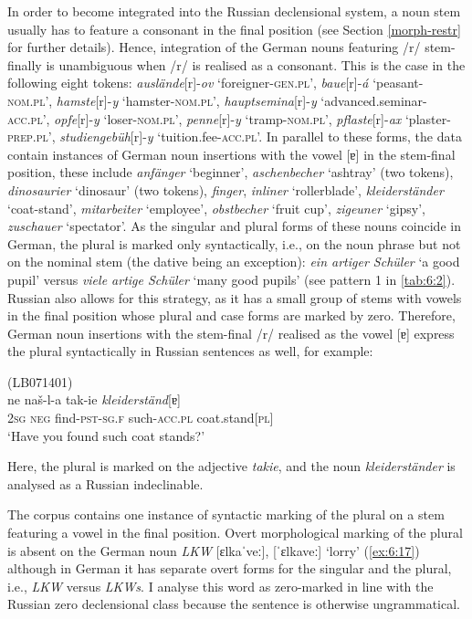 In order to become integrated into the Russian declensional system, a noun stem usually has to feature a consonant in the final position (see Section \ref{morph-restr} for further details). Hence, integration of the German nouns featuring /r/ stem-finally is unambiguous when /r/ is realised as a consonant. This is the case in the following eight tokens: \textit{auslände}[r]-\textit{ov} `foreigner-\textsc{gen.pl}', \textit{baue}[r]-\textit{á} `peasant-\textsc{nom.pl}', \textit{hamste}[r]-\textit{y} `hamster-\textsc{nom.pl}', \textit{hauptsemina}[r]-\textit{y}  ‘advanced.seminar-\textsc{acc}.\textsc{pl}’, \textit{opfe}[r]-\textit{y} `loser-\textsc{nom.pl}', \textit{penne}[r]-\textit{y} `tramp-\textsc{nom.pl}', \textit{pflaste}[r]-\textit{ax} `plaster-\textsc{prep.pl}', \textit{studiengebüh}[r]-\textit{y} `tuition.fee-\textsc{acc.pl}'. In parallel to these forms, the data contain instances of German noun insertions with the vowel [ɐ] in the stem-final position, these include \textit{anfänger} `beginner', \textit{aschenbecher} `ashtray' (two tokens), \textit{dinosaurier} `dinosaur' (two tokens), \textit{finger}, \textit{inliner} `rollerblade',  \textit{kleiderständer} `coat-stand', \textit{mitarbeiter} `employee', \textit{obstbecher} `fruit cup', \textit{zigeuner} `gipsy', \textit{zuschauer} `spectator'. As the singular and plural forms of these nouns coincide in German, the plural is marked only syntactically, i.e., on the noun phrase but not on the nominal stem (the dative being an exception): \textit{ein artiger Schüler} `a good pupil' versus \textit{viele artige Schüler} `many good pupils' (see pattern 1 in \ref{tab:6:2}). Russian also allows for this strategy, as it has a small group of stems with vowels in the final position whose plural and case forms are marked by zero. Therefore, German noun insertions with the stem-final /r/ realised as the vowel [ɐ] express the plural syntactically in Russian sentences as well, for example:

\ea
\label{ex:6:16}
(LB071401)\\
 {ne} {naš-l-a} {tak-ie} \textit{kleiderständ}[ɐ]\\
	\textsc{2sg} \textsc{neg} find-\textsc{pst-sg.f} such-\textsc{acc.pl} coat.stand[\textsc{pl}]\\
\glt `Have you found such coat stands?'
\z

\noindent Here, the plural is marked on the adjective \textit{takie}, and the noun \textit{kleiderständer} is analysed as a Russian indeclinable. 

The corpus contains one instance of syntactic marking of the plural on a stem featuring a vowel in the final position. Overt morphological marking of the plural is absent on the German noun \textit{LKW} [ɛlkaˈveː], [ˈɛlkaveː] `lorry' (\ref{ex:6:17}) although in German it has separate overt forms for the singular and the plural, i.e., \textit{LKW} versus \textit{LKWs}. I analyse this word as zero-marked in line with the Russian zero declensional class because the sentence is otherwise ungrammatical.

